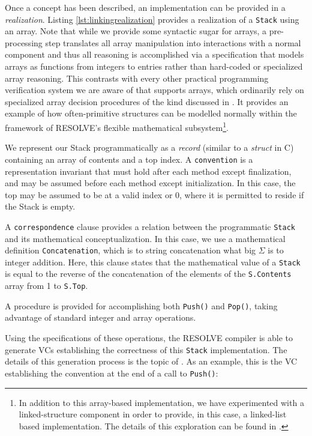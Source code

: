 Once a concept has been described, an implementation can be provided in a \emph{realization}.  Listing \ref{lst:linkingrealization} provides a realization of a \texttt{Stack} using an array.  Note that while we provide some syntactic sugar for arrays, a pre-processing step translates all array manipulation into interactions with a normal component and thus all reasoning is accomplished via a specification that models arrays as functions from integers to entries rather than hard-coded or specialized array reasoning.  This contrasts with every other practical programming verification system we are aware of that supports arrays, which ordinarily rely on specialized array decision procedures of the kind discussed in \cite{bradley2006s}. It provides an example of how often-primitive structures can be modelled normally within the framework of RESOLVE's flexible mathematical subsystem\footnote{In addition to this array-based implementation, we have experimented with a linked-structure component in order to provide, in this case, a linked-list based implementation.  The details of this exploration can be found in \cite{kulczyckiPointers}.}.



We represent our Stack programmatically as a \emph{record} (similar to a \emph{struct} in C) containing an array of contents and a top index.  A \texttt{convention} is a representation invariant that must hold after each method except finalization, and may be assumed before each method except initialization.  In this case, the top may be assumed to be at a valid index or  0, where it is permitted to reside if the Stack is empty.

A \texttt{correspondence} clause provides a relation between the programmatic \texttt{Stack} and its mathematical conceptualization.  In this case, we use a mathematical definition \texttt{Concatenation}, which is to string concatenation what big $\Sigma$ is to integer addition.  Here, this clause states that the mathematical value of a \texttt{Stack} is equal to the reverse of the concatenation of the elements of the \texttt{S.Contents} array from 1 to \texttt{S.Top}.

A procedure is provided for accomplishing both \texttt{Push()} and \texttt{Pop()}, taking advantage of standard integer and array operations.

Using the specifications of these operations, the RESOLVE compiler is able to generate VCs establishing the correctness of this \texttt{Stack} implementation.  The details of this generation process is the topic of \cite{hartonDissertation}.  As an example, this is the VC establishing the convention at the end of a call to \texttt{Push()}:

